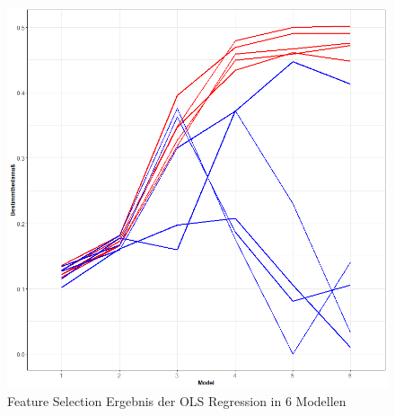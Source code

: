 \documentclass[a4paper,12pt]{thesis}
\begin{document}
\begin{figure}[!ht]
	\centering
	\includegraphics[width=\textwidth]{Plots/plot30.png}
	\caption{Feature Selection  Ergebnis der OLS Regression in 6 Modellen}
	\label{OLS_ModelSelection}
\end{figure}
\end{document}
